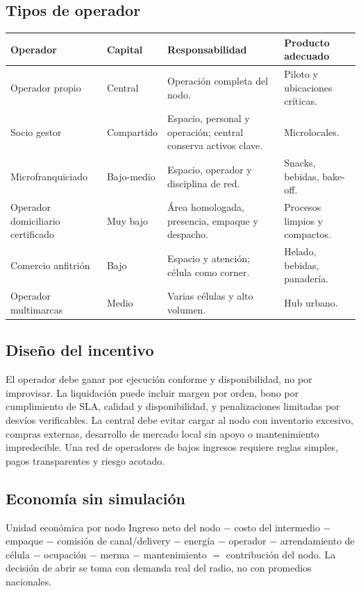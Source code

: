 \documentclass[11pt,a4paper]{article}
\begin{document}
\subsection{Tipos de operador}
{\small
\begin{xltabular}{\textwidth}{@{}P{3.3cm}P{2cm}LL@{}}
\toprule
\textbf{Operador} & \textbf{Capital} & \textbf{Responsabilidad} & \textbf{Producto adecuado}\\ \midrule
Operador propio & Central & Operación completa del nodo. & Piloto y ubicaciones críticas.\\
Socio gestor & Compartido & Espacio, personal y operación; central conserva activos clave. & Microlocales.\\
Microfranquiciado & Bajo-medio & Espacio, operador y disciplina de red. & Snacks, bebidas, bake-off.\\
Operador domiciliario certificado & Muy bajo & Área homologada, presencia, empaque y despacho. & Procesos limpios y compactos.\\
Comercio anfitrión & Bajo & Espacio y atención; célula como corner. & Helado, bebidas, panadería.\\
Operador multimarcas & Medio & Varias células y alto volumen. & Hub urbano.\\
\bottomrule
\end{xltabular}}

\subsection{Diseño del incentivo}
El operador debe ganar por ejecución conforme y disponibilidad, no por improvisar. La liquidación puede
incluir margen por orden, bono por cumplimiento de SLA, calidad y disponibilidad, y penalizaciones
limitadas por desvíos verificables. La central debe evitar cargar al nodo con inventario excesivo,
compras externas, desarrollo de mercado local sin apoyo o mantenimiento impredecible. Una red de
operadores de bajos ingresos requiere reglas simples, pagos transparentes y riesgo acotado.

\subsection{Economía sin simulación}
\begin{caja}{Unidad económica por nodo}
Ingreso neto del nodo $-$ costo del intermedio $-$ empaque $-$ comisión de canal/delivery $-$ energía
$-$ operador $-$ arrendamiento de célula $-$ ocupación $-$ merma $-$ mantenimiento $=$ contribución del
nodo. La decisión de abrir se toma con demanda real del radio, no con promedios nacionales.
\end{caja}
\end{document}
